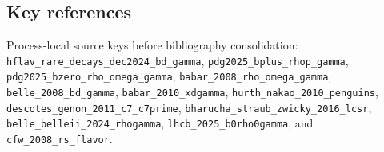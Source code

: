 \subsection*{Key references}
Process-local source keys before bibliography consolidation:
\texttt{hflav\_rare\_decays\_dec2024\_bd\_gamma},
\texttt{pdg2025\_bplus\_rhop\_gamma},
\texttt{pdg2025\_bzero\_rho\_omega\_gamma},
\texttt{babar\_2008\_rho\_omega\_gamma},
\texttt{belle\_2008\_bd\_gamma},
\texttt{babar\_2010\_xdgamma},
\texttt{hurth\_nakao\_2010\_penguins},
\texttt{descotes\_genon\_2011\_c7\_c7prime},
\texttt{bharucha\_straub\_zwicky\_2016\_lcsr},
\texttt{belle\_belleii\_2024\_rhogamma},
\texttt{lhcb\_2025\_b0rho0gamma}, and
\texttt{cfw\_2008\_rs\_flavor}.
